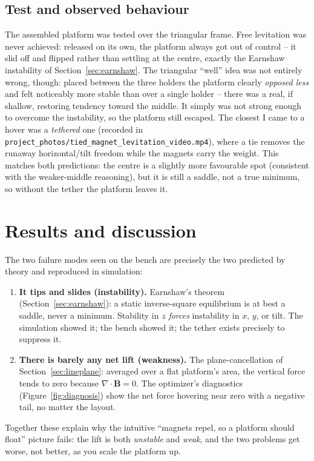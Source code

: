 \documentclass[11pt]{article}
\begin{document}
\subsection{Test and observed behaviour}

The assembled platform was tested over the triangular frame. Free levitation was
never achieved: released on its own, the platform always got out of control --
it slid off and flipped rather than settling at the centre, exactly the Earnshaw
instability of Section~\ref{sec:earnshaw}. The triangular ``well'' idea was not
entirely wrong, though: placed between the three holders the platform clearly
\emph{opposed less} and felt noticeably more stable than over a single holder --
there was a real, if shallow, restoring tendency toward the middle. It simply
was not strong enough to overcome the instability, so the platform still
escaped. The closest I came to a hover was a \emph{tethered} one (recorded in
\texttt{project\_photos/tied\_magnet\_levitation\_video.mp4}), where a tie
removes the runaway horizontal/tilt freedom while the magnets carry the weight.
This matches both predictions: the centre is a slightly more favourable spot
(consistent with the weaker-middle reasoning), but it is still a saddle, not a
true minimum, so without the tether the platform leaves it.

\section{Results and discussion}

The two failure modes seen on the bench are precisely the two predicted by
theory and reproduced in simulation:
%
\begin{enumerate}
  \item \textbf{It tips and slides (instability).} Earnshaw's theorem
        (Section~\ref{sec:earnshaw}): a static inverse-square equilibrium is at
        best a saddle, never a minimum. Stability in $z$ \emph{forces}
        instability in $x$, $y$, or tilt. The simulation showed it; the bench
        showed it; the tether exists precisely to suppress it.
  \item \textbf{There is barely any net lift (weakness).} The plane-cancellation
        of Section~\ref{sec:lineplane}: averaged over a flat platform's area,
        the vertical force tends to zero because $\nabla\cdot\mathbf{B}=0$. The
        optimizer's diagnostics (Figure~\ref{fig:diagnosis}) show the net force
        hovering near zero with a negative tail, no matter the layout.
\end{enumerate}
%
Together these explain why the intuitive ``magnets repel, so a platform should
float'' picture fails: the lift is both \emph{unstable} and \emph{weak}, and the
two problems get worse, not better, as you scale the platform up.
\end{document}
